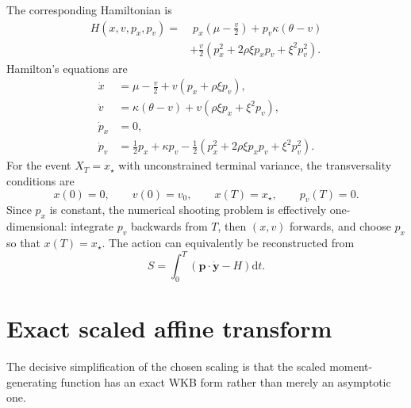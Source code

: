 \documentclass[11pt]{article}
\newcommand{\dd}{\mathrm d}
\begin{document}
The corresponding Hamiltonian is
\begin{align}
 H(x,v,p_x,p_v)=&\;p_x\left(\mu-\frac v2\right)
 +p_v\kappa(\theta-v)\nonumber\\
 &+\frac v2\left(p_x^2+2\rho\xi p_xp_v+\xi^2p_v^2\right).
 \label{eq:Hamiltonian}
\end{align}
Hamilton's equations are
\begin{align}
 \dot x&=\mu-\frac v2+v(p_x+\rho\xi p_v),\\
 \dot v&=\kappa(\theta-v)+v(\rho\xi p_x+\xi^2p_v),\\
 \dot p_x&=0,\\
 \dot p_v&=\frac12p_x+\kappa p_v
 -\frac12\left(p_x^2+2\rho\xi p_xp_v+\xi^2p_v^2\right).
 \label{eq:Hameqs}
\end{align}
For the event $X_T=x_\star$ with unconstrained terminal variance, the transversality conditions are
\begin{equation}
 x(0)=0,\qquad v(0)=v_0,\qquad x(T)=x_\star,\qquad p_v(T)=0.
\end{equation}
Since $p_x$ is constant, the numerical shooting problem is effectively one-dimensional: integrate $p_v$ backwards from $T$, then $(x,v)$ forwards, and choose $p_x$ so that $x(T)=x_\star$. The action can equivalently be reconstructed from
\begin{equation}
 S=\int_0^T\left(\bm p\cdot\dot{\bm y}-H\right)\dd t.
\end{equation}

\section{Exact scaled affine transform}
The decisive simplification of the chosen scaling is that the scaled moment-generating function has an exact WKB form rather than merely an asymptotic one.
\end{document}
